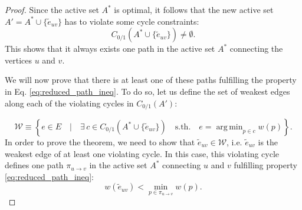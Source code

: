 \documentclass[12pt]{article}
\DeclareMathOperator*{\argmin}{arg\,min}
\begin{document}
\begin{proof}
Since the active set $A^*$ is optimal, it follows that the new active set $A' = A^* \cup \{ \tilde{e}_{uv}\}$ has to violate some cycle constraints:
\begin{equation}
C_{0/1}(A^* \cup \{ \tilde{e}_{uv}\}) \neq \emptyset.
\end{equation}
This shows that %
it always exists one path in the active set $A^*$ connecting the vertices $u$ and $v$.

We will now prove that there is at least one of these paths fulfilling the property in Eq. \ref{eq:reduced_path_ineq}. To do so, let us define the set of weakest edges along each of the violating cycles in $C_{0/1}(A')$:

\begin{equation}
\mathcal{W} \equiv \left\{ e \in E \quad \Big| \quad\exists \, c\in C_{0/1}(A^* \cup \{ \tilde{e}_{uv}\}) \quad \mathrm{s.th.} \quad e = \argmin_{p\in c} w(p) \right\}.
\end{equation}
In order to prove the theorem, we need to show that $\tilde{e}_{uv} \in \mathcal{W}$, i.e. $\tilde{e}_{uv}$ is the weakest edge of at least one violating cycle. In this case, this violating cycle defines one path $\pi_{u \rightarrow v}$ in the active set $A^*$ connecting $u$ and $v$ fulfilling property \ref{eq:reduced_path_ineq}:
\begin{equation}
w(\tilde{e}_{uv}) < \min_{p\in \pi_{u \rightarrow v}}  w(p).
\end{equation}


\end{proof}
\end{document}

